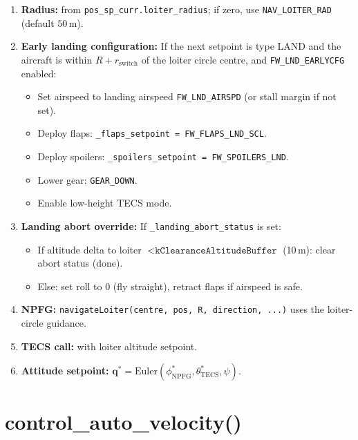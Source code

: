 \documentclass[12pt,a4paper]{article}
\begin{document}
\begin{enumerate}
  \item \textbf{Radius:} from \texttt{pos\_sp\_curr.loiter\_radius}; if zero,
        use \texttt{NAV\_LOITER\_RAD} (default $50\,\text{m}$).

  \item \textbf{Early landing configuration:}
        If the next setpoint is type LAND and the aircraft is within
        $R + r_{\text{switch}}$ of the loiter circle centre,
        and \texttt{FW\_LND\_EARLYCFG} enabled:
        \begin{itemize}
          \item Set airspeed to landing airspeed \texttt{FW\_LND\_AIRSPD}
                (or stall margin if not set).
          \item Deploy flaps: \texttt{\_flaps\_setpoint = FW\_FLAPS\_LND\_SCL}.
          \item Deploy spoilers: \texttt{\_spoilers\_setpoint = FW\_SPOILERS\_LND}.
          \item Lower gear: \texttt{GEAR\_DOWN}.
          \item Enable low-height TECS mode.
        \end{itemize}

  \item \textbf{Landing abort override:}
        If \texttt{\_landing\_abort\_status} is set:
        \begin{itemize}
          \item If altitude delta to loiter $< \texttt{kClearanceAltitudeBuffer}$
                (10\,m): clear abort status (done).
          \item Else: set roll to 0 (fly straight), retract flaps if
                airspeed is safe.
        \end{itemize}

  \item \textbf{NPFG:} \texttt{navigateLoiter(centre, pos, R, direction, ...)}
        uses the loiter-circle guidance.

  \item \textbf{TECS call:} with loiter altitude setpoint.

  \item \textbf{Attitude setpoint:}
        $\mathbf{q}^* = \text{Euler}(\phi^*_{\text{NPFG}}, \theta^*_{\text{TECS}}, \psi)$.
\end{enumerate}

\section{control\_auto\_velocity()}
\end{document}

